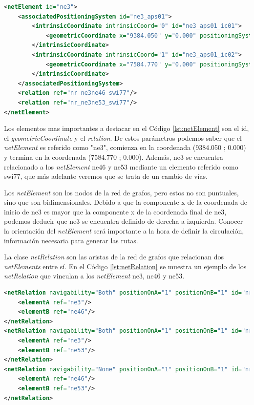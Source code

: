     \begin{lstlisting}[language = XML, caption = Clase \textit{netElement} , label = {lst:netElement}]
<netElement id="ne3">
    <associatedPositioningSystem id="ne3_aps01">
        <intrinsicCoordinate intrinsicCoord="0" id="ne3_aps01_ic01">
            <geometricCoordinate x="9384.050" y="0.000" positioningSystemRef="gps01"/>
        </intrinsicCoordinate>
        <intrinsicCoordinate intrinsicCoord="1" id="ne3_aps01_ic02">
            <geometricCoordinate x="7584.770" y="0.000" positioningSystemRef="gps01"/>
        </intrinsicCoordinate>
    </associatedPositioningSystem>
    <relation ref="nr_ne3ne46_swi77"/>
    <relation ref="nr_ne3ne53_swi77"/>
</netElement>
    \end{lstlisting}
    
    Los elementos mas importantes a destacar en el Código \ref{lst:netElement} son el id, el \textit{geometricCoordinate} y el \textit{relation}. De estos parámetros podemos saber que el \textit{netElement} es referido como "ne3", comienza en la coordenada (9384.050 ; 0.000) y termina en la coordenada (7584.770 ; 0.000). Además, ne3 se encuentra relacionado a los \textit{netElement} ne46 y ne53 mediante un elemento referido como swi77, que más adelante veremos que se trata de un cambio de vías.

    Los \textit{netElement} son los nodos de la red de grafos, pero estos no son puntuales, sino que son bidimensionales. Debido a que la componente x de la coordenada de inicio de ne3 es mayor que la componente x de la coordenada final de ne3, podemos deducir que ne3 se encuentra definido de derecha a izquierda. Conocer la orientación del \textit{netElement} será importante a la hora de definir la circulación, información necesaria para generar las rutas.

    La clase \textit{netRelation} son las aristas de la red de grafos que relacionan dos \textit{netElements} entre sí. En el Código \ref{lst:netRelation} se muestra un ejemplo de los \textit{netRelation} que vinculan a los \textit{netElement} ne3, ne46 y ne53.    
    
    \begin{lstlisting}[language = XML, caption = Clase \textit{netRelation} , label = {lst:netRelation}]
<netRelation navigability="Both" positionOnA="1" positionOnB="1" id="nr_ne3ne46_swi77">
    <elementA ref="ne3"/>
    <elementB ref="ne46"/>
</netRelation>
<netRelation navigability="Both" positionOnA="1" positionOnB="1" id="nr_ne3ne53_swi77">
    <elementA ref="ne3"/>
    <elementB ref="ne53"/>
</netRelation>
<netRelation navigability="None" positionOnA="1" positionOnB="1" id="nr_ne46ne53_swi77">
    <elementA ref="ne46"/>
    <elementB ref="ne53"/>
</netRelation>
    \end{lstlisting}
    
